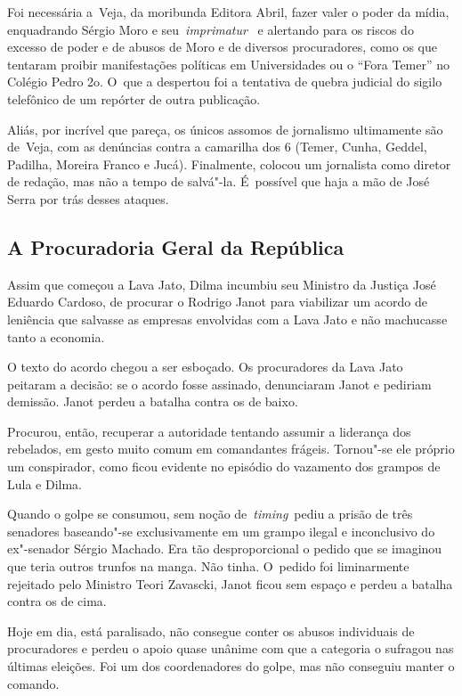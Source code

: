 Foi necessária a~Veja, da moribunda Editora Abril, fazer valer o poder
da mídia, enquadrando Sérgio Moro e seu~\emph{imprimatur}~ e alertando
para os riscos do excesso de poder e de abusos de Moro e de diversos
procuradores, como os que tentaram proibir manifestações políticas em
Universidades ou o ``Fora Temer'' no Colégio Pedro 2o. O~que a despertou
foi a tentativa de quebra judicial do sigilo telefônico de um repórter
de outra publicação.

Aliás, por incrível que pareça, os únicos assomos de jornalismo
ultimamente são de~Veja, com as denúncias contra a camarilha dos 6
(Temer, Cunha, Geddel, Padilha, Moreira Franco e Jucá). Finalmente,
colocou um jornalista como diretor de redação, mas não a tempo de
salvá"-la. É~possível que haja a mão de José Serra por trás desses
ataques.

\subsection{A Procuradoria Geral da República}

Assim que começou a Lava Jato, Dilma incumbiu seu Ministro da Justiça
José Eduardo Cardoso, de procurar o  Rodrigo Janot para viabilizar um
acordo de leniência que salvasse as empresas envolvidas com a Lava Jato
e não machucasse tanto a economia.

O texto do acordo chegou a ser esboçado. Os procuradores da Lava Jato
peitaram a decisão: se o acordo fosse assinado, denunciaram Janot e
pediriam demissão. Janot perdeu a batalha contra os de baixo.

Procurou, então, recuperar a autoridade tentando assumir a liderança dos
rebelados, em gesto muito comum em comandantes frágeis. Tornou"-se ele
próprio um conspirador, como ficou evidente no episódio do vazamento dos
grampos de Lula e Dilma.

Quando o golpe se consumou, sem noção de~\emph{timing}~pediu a prisão de
três senadores baseando"-se exclusivamente em um grampo ilegal e
inconclusivo do ex"-senador Sérgio Machado. Era tão desproporcional o
pedido que se imaginou que teria outros trunfos na manga. Não tinha. O~pedido foi liminarmente rejeitado pelo Ministro Teori Zavascki, Janot
ficou sem espaço e perdeu a batalha contra os de cima.

Hoje em dia, está paralisado, não consegue conter os abusos individuais
de procuradores e perdeu o apoio quase unânime com que a categoria o
sufragou nas últimas eleições. Foi um dos coordenadores do golpe, mas
não conseguiu manter o comando.

